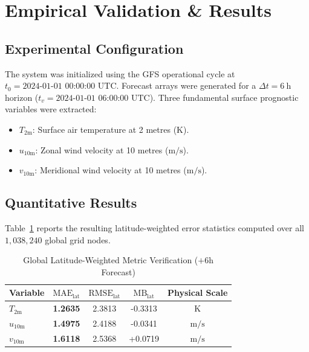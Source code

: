 \documentclass[10pt,journal,compsoc]{IEEEtran}
\begin{document}
\section{Empirical Validation \& Results}

\subsection{Experimental Configuration}
The system was initialized using the GFS operational cycle at $t_0 = \text{2024-01-01 00:00:00 UTC}$. Forecast arrays were generated for a $\Delta t = \SI{6}{\hour}$ horizon ($t_v = \text{2024-01-01 06:00:00 UTC}$). Three fundamental surface prognostic variables were extracted:
\begin{itemize}
    \item $T_{2\text{m}}$: Surface air temperature at 2 metres ($\si{\kelvin}$).
    \item $u_{10\text{m}}$: Zonal wind velocity at 10 metres ($\si{\metre\per\second}$).
    \item $v_{10\text{m}}$: Meridional wind velocity at 10 metres ($\si{\metre\per\second}$).
\end{itemize}

\subsection{Quantitative Results}
Table~\ref{tab:results} reports the resulting latitude-weighted error statistics computed over all $1,038,240$ global grid nodes.

\begin{table}[htbp]
\caption{Global Latitude-Weighted Metric Verification ($+6\text{h}$ Forecast)}
\label{tab:results}
\centering
\begin{tabular}{lcccc}
\toprule
Variable & $\text{MAE}_{\text{lat}}$ & $\text{RMSE}_{\text{lat}}$ & $\text{MB}_{\text{lat}}$ & Physical Scale \\
\midrule
$T_{2\text{m}}$ & \textbf{1.2635} & 2.3813 & -0.3313 & $\si{\kelvin}$ \\
$u_{10\text{m}}$ & \textbf{1.4975} & 2.4188 & -0.0341 & $\si{\metre\per\second}$ \\
$v_{10\text{m}}$ & \textbf{1.6118} & 2.5368 & +0.0719 & $\si{\metre\per\second}$ \\
\bottomrule
\end{tabular}
\end{table}
\end{document}
